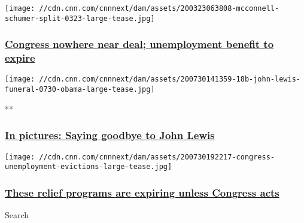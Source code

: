 \href{/2020/07/30/politics/stimulus-latest-negotiations-impasse/index.html}{}

\texttt{[image: //cdn.cnn.com/cnnnext/dam/assets/200323063808-mcconnell-schumer-split-0323-large-tease.jpg]}

\hypertarget{congress-nowhere-near-deal-unemployment-benefit-to-expire-}{%
\subsubsection{\texorpdfstring{\href{/2020/07/30/politics/stimulus-latest-negotiations-impasse/index.html}{Congress
nowhere near deal; unemployment benefit to expire
}}{Congress nowhere near deal; unemployment benefit to expire }}\label{congress-nowhere-near-deal-unemployment-benefit-to-expire-}}

\href{/2020/07/25/politics/gallery/john-lewis-funeral-ceremonies/index.html}{}

\texttt{[image: //cdn.cnn.com/cnnnext/dam/assets/200730141359-18b-john-lewis-funeral-0730-obama-large-tease.jpg]}

**

\hypertarget{in-pictures-saying-goodbye-to-john-lewis}{%
\subsubsection{\texorpdfstring{\href{/2020/07/25/politics/gallery/john-lewis-funeral-ceremonies/index.html}{In
pictures: Saying goodbye to John
Lewis}}{In pictures: Saying goodbye to John Lewis}}\label{in-pictures-saying-goodbye-to-john-lewis}}

\href{/2020/07/30/politics/congress-expiring-unemployment-evictions-small-business-loans/index.html}{}

\texttt{[image: //cdn.cnn.com/cnnnext/dam/assets/200730192217-congress-unemployment-evictions-large-tease.jpg]}

\hypertarget{these-relief-programs-are-expiring-unless-congress-acts}{%
\subsubsection{\texorpdfstring{\href{/2020/07/30/politics/congress-expiring-unemployment-evictions-small-business-loans/index.html}{These
relief programs are expiring unless Congress
acts}}{These relief programs are expiring unless Congress acts}}\label{these-relief-programs-are-expiring-unless-congress-acts}}

Search

